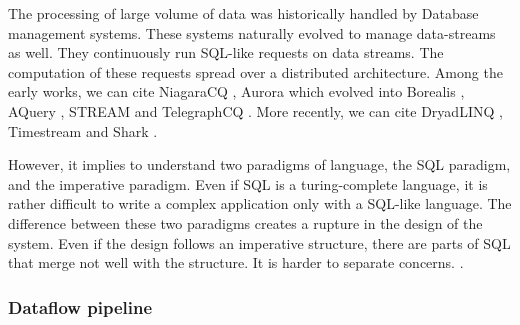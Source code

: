The processing of large volume of data was historically handled by Database management systems.
These systems naturally evolved to manage data-streams as well.
They continuously run SQL-like requests on data streams.
The computation of these requests spread over a distributed architecture.
Among the early works, we can cite NiagaraCQ \cite{Chen2000,Naughton2001}, Aurora \cite{Abadi2003,Abadi2003a,Balakrishnan2004} which evolved into Borealis \cite{Abadi2005}, AQuery \cite{Lerner2003}, STREAM \cite{Arasu2003,Arasu2005} and TelegraphCQ \cite{Krishnamurthy2003,Chandrasekaran2003}.
More recently, we can cite DryadLINQ \cite{Isard2007,Yu2009}, Timestream \cite{Qian2013} and Shark \cite{Xin2013}.

However, it implies to understand two paradigms of language, the SQL paradigm, and the imperative paradigm.
Even if SQL is a turing-complete language, it is rather difficult to write a complex application only with a SQL-like language.
The difference between these two paradigms creates a rupture in the design of the system.
Even if the design follows an imperative structure, there are parts of SQL that merge not well with the structure.
It is harder to separate concerns. .








\subsubsection{Dataflow pipeline} \label{chapter3:software-efficiency:dataflow-pipeline}

